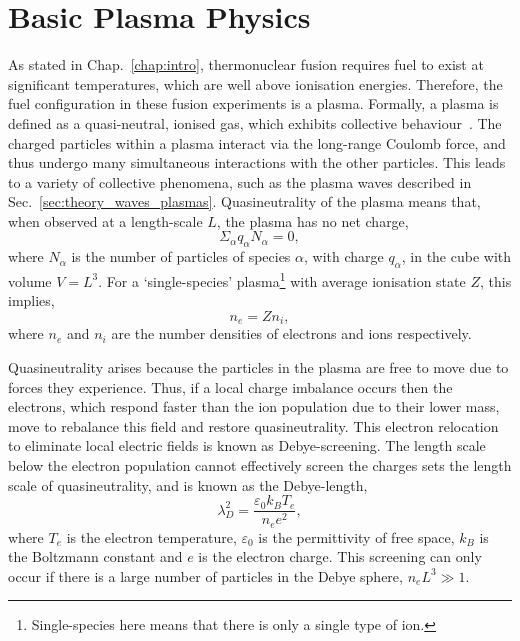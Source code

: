 \section{Basic Plasma Physics}%
\label{sec:theory_plasma_phys}

As stated in Chap.~\ref{chap:intro}, thermonuclear fusion requires fuel to exist at significant temperatures, which are well above ionisation energies.
Therefore, the fuel configuration in these fusion experiments is a plasma.
Formally, a plasma is defined as a quasi-neutral, ionised gas, which exhibits collective behaviour~\cite{chen_introduction_2018}.
The charged particles within a plasma interact via the long-range Coulomb force, and thus undergo many simultaneous interactions with the other particles.
This leads to a variety of collective phenomena, such as the plasma waves described in Sec.~\ref{sec:theory_waves_plasmas}.
Quasineutrality of the plasma means that, when observed at a length-scale $L$, the plasma has no net charge,
\begin{equation}
    \Sigma_{\alpha}q_{\alpha}N_{\alpha} = 0,
\end{equation}
where $N_{\alpha}$ is the number of particles of species $\alpha$, with charge $q_{\alpha}$, in the cube with volume $V=L^3$.
For a `single-species' plasma\footnote{Single-species here means that there is only a single type of ion.} with average ionisation state $Z$, this implies,
\begin{equation}
    n_e = Z n_i,
\end{equation}
where $n_e$ and $n_i$ are the number densities of electrons and ions respectively.

Quasineutrality arises because the particles in the plasma are free to move due to forces they experience.
Thus, if a local charge imbalance occurs then the electrons, which respond faster than the ion population due to their lower mass, move to rebalance this field and restore quasineutrality.
This electron relocation to eliminate local electric fields is known as Debye-screening.
The length scale below the electron population cannot effectively screen the charges sets the length scale of quasineutrality, and is known as the Debye-length,
\begin{equation}
    \lambda_{D}^2 = \frac{\varepsilon_0 k_B T_e}{n_e e^2},
\end{equation}
where $T_e$ is the electron temperature, $\varepsilon_0$ is the permittivity of free space, $k_B$ is the Boltzmann constant and $e$ is the electron charge.
This screening can only occur if there is a large number of particles in the Debye sphere, $n_e L^3\gg 1$.

